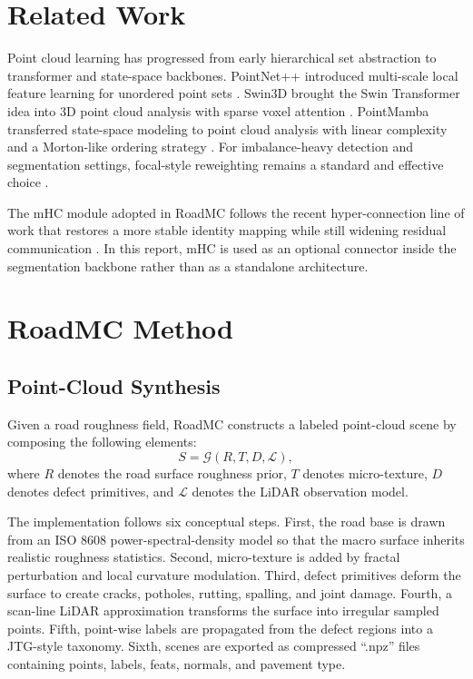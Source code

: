 \documentclass[conference]{IEEEtran}
\begin{document}
\section{Related Work}
Point cloud learning has progressed from early hierarchical set abstraction to transformer and state-space backbones. PointNet++ introduced multi-scale local feature learning for unordered point sets \cite{pointnetpp}. Swin3D brought the Swin Transformer idea into 3D point cloud analysis with sparse voxel attention \cite{swin3d}. PointMamba transferred state-space modeling to point cloud analysis with linear complexity and a Morton-like ordering strategy \cite{pointmamba}. For imbalance-heavy detection and segmentation settings, focal-style reweighting remains a standard and effective choice \cite{focal}.

The mHC module adopted in RoadMC follows the recent hyper-connection line of work that restores a more stable identity mapping while still widening residual communication \cite{mhc}. In this report, mHC is used as an optional connector inside the segmentation backbone rather than as a standalone architecture.

\section{RoadMC Method}
\subsection{Point-Cloud Synthesis}
Given a road roughness field, RoadMC constructs a labeled point-cloud scene by composing the following elements:
\begin{equation}
S = \mathcal{G}(R, T, D, \mathcal{L}),
\end{equation}
where $R$ denotes the road surface roughness prior, $T$ denotes micro-texture, $D$ denotes defect primitives, and $\mathcal{L}$ denotes the LiDAR observation model.

The implementation follows six conceptual steps. First, the road base is drawn from an ISO 8608 power-spectral-density model so that the macro surface inherits realistic roughness statistics. Second, micro-texture is added by fractal perturbation and local curvature modulation. Third, defect primitives deform the surface to create cracks, potholes, rutting, spalling, and joint damage. Fourth, a scan-line LiDAR approximation transforms the surface into irregular sampled points. Fifth, point-wise labels are propagated from the defect regions into a JTG-style taxonomy. Sixth, scenes are exported as compressed ``.npz'' files containing points, labels, feats, normals, and pavement type.
\end{document}
